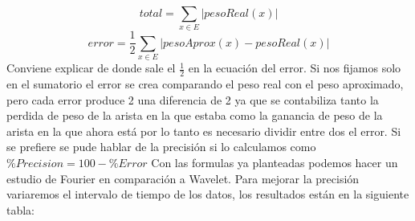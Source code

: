 \documentclass[12pt,a4paper]{article}
\begin{document}
\[ total = \sum_{x \in E} \left | pesoReal(x) \right |\]
\[ error = \frac{1}{2}\sum_{x \in E} \left | pesoAprox(x)-pesoReal(x) \right |\]
		Conviene explicar de donde sale el $\frac{1}{2}$ en la ecuación del error. Si nos fijamos solo en el sumatorio el error se crea comparando el peso real con el peso aproximado, pero cada error produce 2 una diferencia de 2 ya que se contabiliza tanto la perdida de peso de la arista en la que estaba como la ganancia de peso de la arista en la que ahora está por lo tanto es necesario dividir entre dos el error.
		Si se prefiere se pude hablar de la precisión si lo calculamos como $\%Precision = 100 - \%Error$
		Con las formulas ya planteadas podemos hacer un estudio de Fourier en comparación a Wavelet. Para mejorar la precisión variaremos el intervalo de tiempo de los datos, los resultados están en la siguiente tabla:\\
\end{document}
